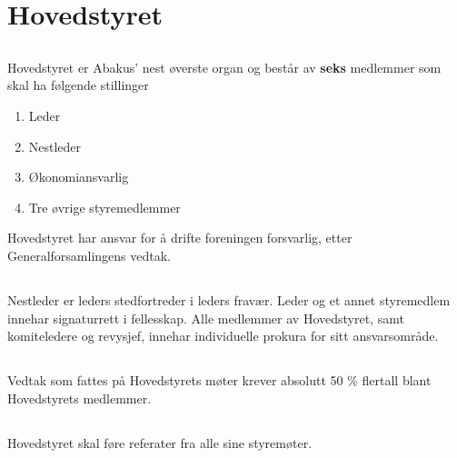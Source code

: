 \section{Hovedstyret}

\subsection{}
Hovedstyret er Abakus’ nest øverste organ og består av \textbf{seks} medlemmer som skal ha følgende stillinger 

\begin{enumerate}[label=\alph*)]
    \item Leder
    \item Nestleder
    \item Økonomiansvarlig
    \item Tre øvrige styremedlemmer
\end{enumerate}
Hovedstyret har ansvar for å drifte foreningen forsvarlig, etter Generalforsamlingens vedtak.
\subsection{}
Nestleder er leders stedfortreder i leders fravær. Leder og et annet styremedlem innehar signaturrett i fellesskap. 
Alle medlemmer av Hovedstyret, samt komiteledere og revysjef, innehar individuelle prokura for sitt ansvarsområde. 

\subsection{}
Vedtak som fattes på Hovedstyrets møter krever absolutt 50 \% flertall blant Hovedstyrets medlemmer.

\subsection{}
Hovedstyret skal føre referater fra alle sine styremøter. 
